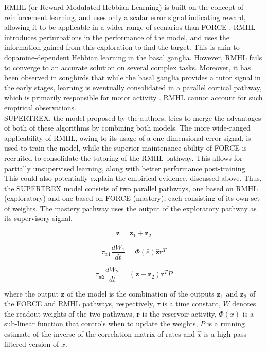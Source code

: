 RMHL (or Reward-Modulated Hebbian Learning) is built on the concept of reinforcement learning, and uses only a scalar error signal indicating reward, allowing it to be applicable in a wider range of scenarios than FORCE \cite{hoerzer2014}. RMHL introduces perturbations in the performance of the model, and uses the information gained from this exploration to find the target. This is akin to dopamine-dependent Hebbian learning in the basal ganglia. However, RMHL fails to converge to an accurate solution on several complex tasks. Moreover, it has been observed in songbirds that while the basal ganglia provides a tutor signal in the early stages, learning is eventually consolidated in a parallel cortical pathway, which is primarily responsible for motor activity \cite{olveczky2011}. RMHL cannot account for such empirical observations.\\


SUPERTREX, the model proposed by the authors, tries to merge the advantages of both of these algorithms by combining both models. The more wide-ranged applicability of RMHL, owing to its usage of a one dimensional error signal, is used to train the model, while the superior maintenance ability of FORCE is recruited to consolidate the tutoring of the RMHL pathway. This allows for partially unsupervised learning, along with better performance post-training. This could also potentially explain the empirical evidence, discussed above. Thus, the SUPERTREX model consists of two parallel pathways, one based on RMHL (exploratory) and one based on FORCE (mastery), each consisting of its own set of weights. The mastery pathway uses the output of the exploratory pathway as its supervisory signal.


\begin{equation}
    \mathbf{z}=\mathbf{z}_{1}+\mathbf{z}_{2}
\end{equation}

\begin{equation}
    \tau_{w 1} \frac{d W_{1}}{d t}=\Phi(\hat{e}) \hat{\mathbf{z}} \mathbf{r}^{T}
\end{equation}

\begin{equation}
    \tau_{w 2} \frac{d W_{2}}{d t}=\left(\mathbf{z}-\mathbf{z}_{2}\right) \mathbf{r}^{T} P
\end{equation}
    
where the output $\mathbf{z}$ of the model is the combination of the outputs $\mathbf{z_1}$ and $\mathbf{z_2}$ of the FORCE and RMHL pathways, respectively, $\tau$ is a time constant, $W$ denotes the readout weights of the two pathways, $\mathbf{r}$ is the reservoir activity,  $\Phi(x)$ is a sub-linear function that controls when to update the weights, $P$ is a running estimate of the inverse of the correlation matrix of rates and $\hat{x}$  is a high-pass filtered version of $x$.


